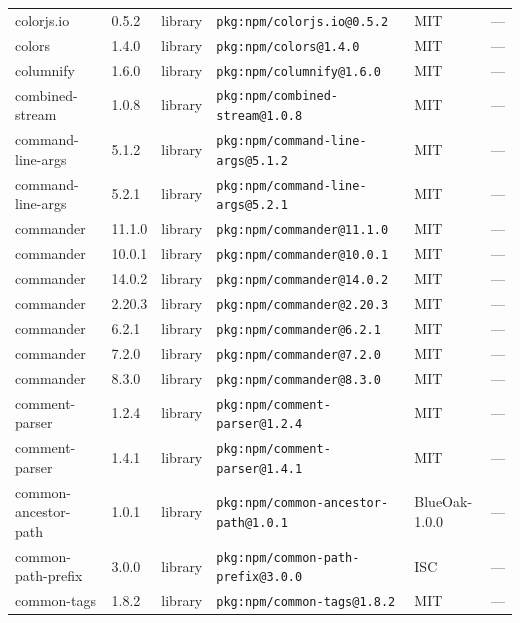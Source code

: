 \documentclass[11pt,a4paper]{article}
\begin{document}
\begin{longtable}{|p{4cm}|p{2cm}|p{1.6cm}|p{5cm}|p{1.5cm}|p{3.5cm}|}
\raggedright colorjs.io & 0.5.2 & library & \small\texttt{pkg:npm/colorjs.io@0.5.2} & MIT & \small — \\
\raggedright colors & 1.4.0 & library & \small\texttt{pkg:npm/colors@1.4.0} & MIT & \small — \\
\raggedright columnify & 1.6.0 & library & \small\texttt{pkg:npm/columnify@1.6.0} & MIT & \small — \\
\raggedright combined-stream & 1.0.8 & library & \small\texttt{pkg:npm/combined-stream@1.0.8} & MIT & \small — \\
\raggedright command-line-args & 5.1.2 & library & \small\texttt{pkg:npm/command-line-args@5.1.2} & MIT & \small — \\
\raggedright command-line-args & 5.2.1 & library & \small\texttt{pkg:npm/command-line-args@5.2.1} & MIT & \small — \\
\raggedright commander & 11.1.0 & library & \small\texttt{pkg:npm/commander@11.1.0} & MIT & \small — \\
\raggedright commander & 10.0.1 & library & \small\texttt{pkg:npm/commander@10.0.1} & MIT & \small — \\
\raggedright commander & 14.0.2 & library & \small\texttt{pkg:npm/commander@14.0.2} & MIT & \small — \\
\raggedright commander & 2.20.3 & library & \small\texttt{pkg:npm/commander@2.20.3} & MIT & \small — \\
\raggedright commander & 6.2.1 & library & \small\texttt{pkg:npm/commander@6.2.1} & MIT & \small — \\
\raggedright commander & 7.2.0 & library & \small\texttt{pkg:npm/commander@7.2.0} & MIT & \small — \\
\raggedright commander & 8.3.0 & library & \small\texttt{pkg:npm/commander@8.3.0} & MIT & \small — \\
\raggedright comment-parser & 1.2.4 & library & \small\texttt{pkg:npm/comment-parser@1.2.4} & MIT & \small — \\
\raggedright comment-parser & 1.4.1 & library & \small\texttt{pkg:npm/comment-parser@1.4.1} & MIT & \small — \\
\raggedright common-ancestor-path & 1.0.1 & library & \small\texttt{pkg:npm/common-ancestor-path@1.0.1} & BlueOak-1.0.0 & \small — \\
\raggedright common-path-prefix & 3.0.0 & library & \small\texttt{pkg:npm/common-path-prefix@3.0.0} & ISC & \small — \\
\raggedright common-tags & 1.8.2 & library & \small\texttt{pkg:npm/common-tags@1.8.2} & MIT & \small — \\

\end{longtable}
\end{document}
